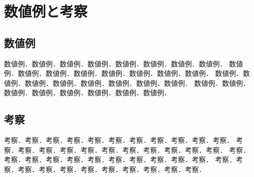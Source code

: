 ﻿%
\chapter{数値例と考察}

\section{数値例}

数値例．数値例．数値例．数値例．数値例．数値例．数値例．数値例．
数値例．数値例．数値例．数値例．数値例．数値例．数値例．数値例．
数値例．数値例．数値例．数値例．数値例．数値例．数値例．数値例．
数値例．数値例．数値例．数値例．数値例．数値例．数値例．数値例．


\section{考察}

考察．考察．考察．考察．考察．考察．考察．考察．考察．考察．考察．
考察．考察．考察．考察．考察．考察．考察．考察．考察．考察．考察．
考察．考察．考察．考察．考察．考察．考察．考察．考察．考察．考察．
考察．考察．考察．考察．考察．考察．考察．考察．考察．考察．考察．
